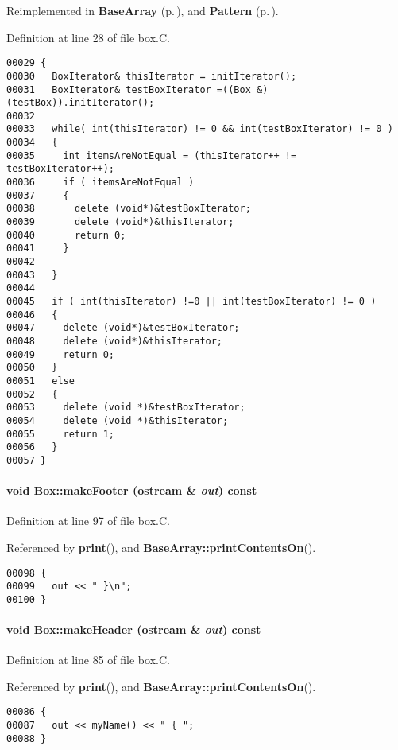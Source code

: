 Reimplemented in {\bf Base\-Array} {\rm (p.\,\pageref{BaseArray_a12})}, and {\bf Pattern} {\rm (p.\,\pageref{Pattern_a4})}.

Definition at line 28 of file box.C.\small\begin{verbatim}00029 {
00030   BoxIterator& thisIterator = initIterator();
00031   BoxIterator& testBoxIterator =((Box &)(testBox)).initIterator();
00032   
00033   while( int(thisIterator) != 0 && int(testBoxIterator) != 0 )
00034   {
00035     int itemsAreNotEqual = (thisIterator++ != testBoxIterator++);
00036     if ( itemsAreNotEqual )
00037     {
00038       delete (void*)&testBoxIterator;
00039       delete (void*)&thisIterator;
00040       return 0;
00041     }
00042     
00043   } 
00044   
00045   if ( int(thisIterator) !=0 || int(testBoxIterator) != 0 )
00046   {
00047     delete (void*)&testBoxIterator;
00048     delete (void*)&thisIterator;
00049     return 0;
00050   }
00051   else  
00052   {
00053     delete (void *)&testBoxIterator;
00054     delete (void *)&thisIterator;
00055     return 1;
00056   }
00057 }
\end{verbatim}\normalsize 
\label{Box_a10}
\paragraph{\setlength{\rightskip}{0pt plus 5cm}void Box::make\-Footer (ostream \& {\em out}) const\hspace{0.3cm}{\tt  [virtual]}}\hfill



Definition at line 97 of file box.C.

Referenced by {\bf print}(), and {\bf Base\-Array::print\-Contents\-On}().\small\begin{verbatim}00098 {
00099   out << " }\n";
00100 }
\end{verbatim}\normalsize 
\label{Box_a8}
\paragraph{\setlength{\rightskip}{0pt plus 5cm}void Box::make\-Header (ostream \& {\em out}) const\hspace{0.3cm}{\tt  [virtual]}}\hfill



Definition at line 85 of file box.C.

Referenced by {\bf print}(), and {\bf Base\-Array::print\-Contents\-On}().\small\begin{verbatim}00086 {
00087   out << myName() << " { ";
00088 }
\end{verbatim}\normalsize 
\label{Box_a9}
